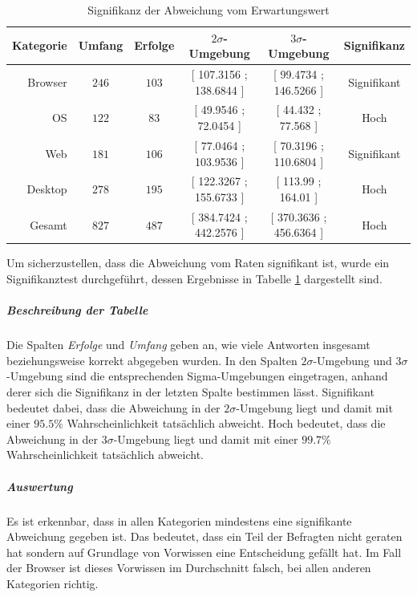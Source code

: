 \documentclass[a4paper]{article}
\begin{document}
                \begin{table}
                    \centering
                    \begin{tabular}{rccccc}
                        Kategorie & Umfang & Erfolge & $2\sigma$-Umgebung & $3\sigma$-Umgebung & Signifikanz \\\hline\hline
                        Browser & $246$ & $103$ & \tiny [ 107.3156 ; 138.6844 ] & \tiny [ 99.4734 ; 146.5266 ] & Signifikant\\
                        OS & $122$ & $83$ & \tiny [ 49.9546 ; 72.0454 ] &  \tiny [ 44.432 ; 77.568 ] & Hoch\\
                        Web & $181$ & $106$ & \tiny [ 77.0464 ; 103.9536 ] &  \tiny [ 70.3196 ; 110.6804 ] &  Signifikant\\
                        Desktop & $278$ & $195$ & \tiny [ 122.3267 ; 155.6733 ] & \tiny [ 113.99 ; 164.01 ] & Hoch\\\hline
                        Gesamt & $827$ & $487$ & \tiny [ 384.7424 ; 442.2576 ] & \tiny [ 370.3636 ; 456.6364 ] & Hoch
                    \end{tabular}
                    \caption{Signifikanz der Abweichung vom Erwartungswert}
                    \label{table:knowledge_by_category_sigma}
                \end{table}
                
                Um sicherzustellen, dass die Abweichung vom Raten signifikant ist, wurde ein Signifikanztest durchgeführt, dessen Ergebnisse in Tabelle \ref{table:knowledge_by_category_sigma} dargestellt sind. 
                
                \subparagraph{Beschreibung der Tabelle}
                    Die Spalten \emph{Erfolge} und \emph{Umfang} geben an, wie viele Antworten insgesamt beziehungsweise korrekt abgegeben wurden. In den Spalten $2\sigma$-Umgebung und $3\sigma$-Umgebung sind die entsprechenden Sigma-Umgebungen eingetragen, anhand derer sich die Signifikanz in der letzten Spalte bestimmen lässt. Signifikant bedeutet dabei, dass die Abweichung in der $2\sigma$-Umgebung liegt und damit mit einer $95.5\%$ Wahrscheinlichkeit tatsächlich abweicht. Hoch bedeutet, dass die Abweichung in der $3\sigma$-Umgebung liegt und damit mit einer $99.7\%$ Wahrscheinlichkeit tatsächlich abweicht.
                    
                \subparagraph{Auswertung}
                    Es ist erkennbar, dass in allen Kategorien mindestens eine signifikante Abweichung gegeben ist. Das bedeutet, dass ein Teil der Befragten nicht geraten hat sondern auf Grundlage von Vorwissen eine Entscheidung gefällt hat. Im Fall der Browser ist dieses Vorwissen im Durchschnitt falsch, bei allen anderen Kategorien richtig.
                    
\end{document}
